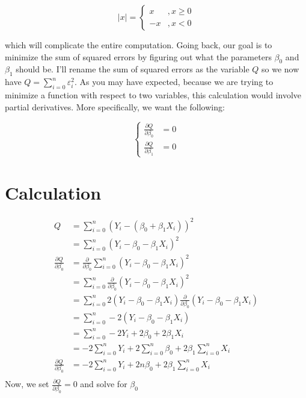\documentclass[12pt,a4paper]{article}
\begin{document}
$$|x| = \begin{cases}
    x&, x \geq 0 \\
    -x&, x < 0
\end{cases}$$

which will complicate the entire computation. Going back, our goal is to minimize the sum of squared errors by figuring out what the parameters $\beta_0$ and $\beta_1$ should be. I'll rename the sum of squared errors as the variable $Q$ so we now have $Q = \sum_{i=0}^n \varepsilon_i^2$. As you may have expected, because we are trying to minimize a function with respect to two variables, this calculation would involve partial derivatives. More specifically, we want the following:

$$\begin{cases}
        \displaystyle\frac{\partial Q}{\partial \beta_0} &= 0\\
        \displaystyle\frac{\partial Q}{\partial \beta_1} &= 0
    \end{cases}$$
    \section{Calculation}
    \begin{align*}
        Q &= \sum_{i=0}^n(Y_i - (\beta_0 + \beta_1X_i ))^2 \\
        &= \sum_{i=0}^n(Y_i - \beta_0 - \beta_1X_i )^2 \\
        \frac{\partial Q}{\partial \beta_0}&=  \frac{\partial}{\partial \beta_0}\sum_{i=0}^n(Y_i - \beta_0 - \beta_1X_i )^2 \\
        &=  \sum_{i=0}^n\frac{\partial}{\partial \beta_0}(Y_i - \beta_0 - \beta_1X_i )^2  \\
        &=  \sum_{i=0}^{n}2(Y_i - \beta_0 - \beta_1X_i )\frac{\partial}{\partial \beta_0}(Y_i - \beta_0 - \beta_1X_i ) \\
          &=  \sum_{i=0}^{n}-2(Y_i - \beta_0 - \beta_1X_i ) \\
          &=  \sum_{i=0}^{n}-2Y_i + 2\beta_0 +2\beta_1X_i \\
&=  -2\sum_{i=0}^{n}Y_i + 2\sum_{i=0}^{n}\beta_0 +2\beta_1\sum_{i=0}^{n}X_i \\
\frac{\partial Q}{\partial \beta_0} &=  -2\sum_{i=0}^{n}Y_i + 2n\beta_0 +2\beta_1\sum_{i=0}^{n}X_i \\
    \end{align*}
    Now, we set $\displaystyle\frac{\partial Q}{\partial \beta_0} = 0$ and solve for $\beta_0$
\end{document}
